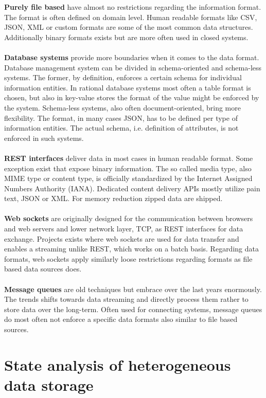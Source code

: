 \noindent\textbf{Purely file based} have almost no restrictions regarding the information format. The format is often defined on domain level. Human readable formats like CSV, JSON, XML or custom formats are some of the most common data structures. Additionally binary formats exists but are more often used in closed systems.
\\\\
\textbf{Database systems} provide more boundaries when it comes to the data format. Database management system can be divided in schema-oriented and schema-less systems. The former, by definition, enforces a certain schema for individual information entities. In rational database systems most often a table format is chosen, but also in key-value stores the format of the value might be enforced by the system. Schema-less systems, also often document-oriented, bring more flexibility. The format, in many cases JSON, has to be defined per type of information entities. The actual schema, i.e. definition of attributes, is not enforced in such systems.
\\\\
\textbf{REST interfaces} deliver data in most cases in human readable format. Some exception exist that expose binary information. The so called media type, also MIME type or content type, is officially standardized by the Internet Assigned Numbers Authority (IANA). Dedicated content delivery APIs mostly utilize pain text, JSON or XML. For memory reduction zipped data are shipped. 
\\\\
\textbf{Web sockets} are originally designed for the communication between browsers and web servers and lower network layer, TCP, as REST interfaces for data exchange. Projects exists where web sockets are used for data transfer and enables a streaming unlike REST, which works on a batch basis. Regarding data formats, web sockets apply similarly loose restrictions regarding formats as file based data sources does.
\\\\
\textbf{Message queues} are old techniques but embrace over the last years enormously. The trends shifts towards data streaming and directly process them rather to store data over the long-term. Often used for connecting systems, message queues do most often not enforce a specific data formats also similar to file based sources.

\section{State analysis of heterogeneous data storage\label{sec:stateanalysis}}

